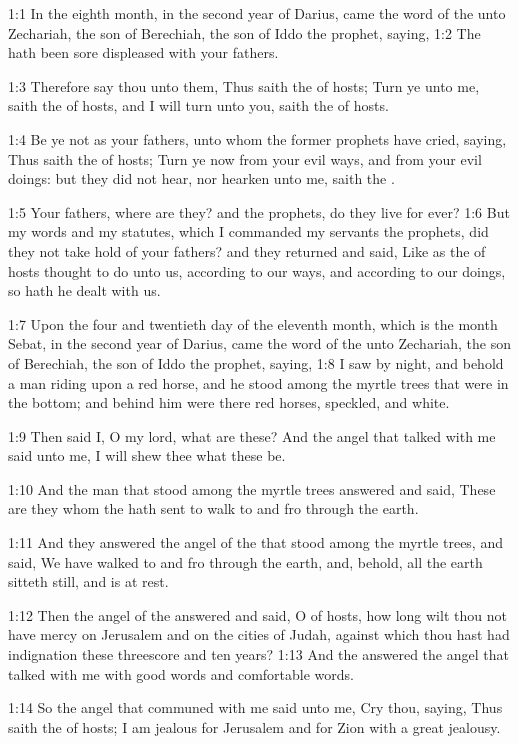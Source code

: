 

1:1 In the eighth month, in the second year of Darius, came the word of the \LORD unto Zechariah, the son of Berechiah, the son of Iddo the prophet, saying, 1:2 The \LORD hath been sore displeased with your fathers.

1:3 Therefore say thou unto them, Thus saith the \LORD of hosts; Turn ye unto me, saith the \LORD of hosts, and I will turn unto you, saith the \LORD of hosts.

1:4 Be ye not as your fathers, unto whom the former prophets have cried, saying, Thus saith the \LORD of hosts; Turn ye now from your evil ways, and from your evil doings: but they did not hear, nor hearken unto me, saith the \LORD.

1:5 Your fathers, where are they? and the prophets, do they live for ever?  1:6 But my words and my statutes, which I commanded my servants the prophets, did they not take hold of your fathers? and they returned and said, Like as the \LORD of hosts thought to do unto us, according to our ways, and according to our doings, so hath he dealt with us.

1:7 Upon the four and twentieth day of the eleventh month, which is the month Sebat, in the second year of Darius, came the word of the \LORD unto Zechariah, the son of Berechiah, the son of Iddo the prophet, saying, 1:8 I saw by night, and behold a man riding upon a red horse, and he stood among the myrtle trees that were in the bottom; and behind him were there red horses, speckled, and white.

1:9 Then said I, O my lord, what are these? And the angel that talked with me said unto me, I will shew thee what these be.

1:10 And the man that stood among the myrtle trees answered and said, These are they whom the \LORD hath sent to walk to and fro through the earth.

1:11 And they answered the angel of the \LORD that stood among the myrtle trees, and said, We have walked to and fro through the earth, and, behold, all the earth sitteth still, and is at rest.

1:12 Then the angel of the \LORD answered and said, O \LORD of hosts, how long wilt thou not have mercy on Jerusalem and on the cities of Judah, against which thou hast had indignation these threescore and ten years?  1:13 And the \LORD answered the angel that talked with me with good words and comfortable words.

1:14 So the angel that communed with me said unto me, Cry thou, saying, Thus saith the \LORD of hosts; I am jealous for Jerusalem and for Zion with a great jealousy.

